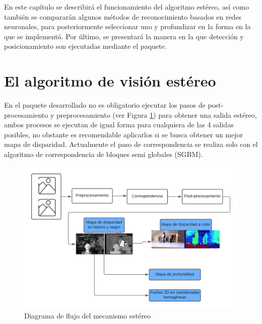 En este capítulo se describirá el funcionamiento del algoritmo estéreo, así como también se compararán algunos métodos de reconocimiento basados en redes neuronales, para posteriormente seleccionar uno y profundizar en la forma en la que se implementó. Por último, se presentará la manera en la que detección y posicionamiento son ejecutadas mediante el paquete. 
\section{El algoritmo de visión estéreo}
En el paquete desarrollado no es obligatorio ejecutar los pasos de post-procesamiento y preprocesamiento (ver Figura \ref{stereo_pipeline}) para obtener una salida estéreo, ambos procesos se ejecutan de igual forma para cualquiera de las 4 salidas posibles, no obstante es recomendable aplicarlos si se busca obtener un mejor mapa de disparidad. Actualmente el paso de correspondencia se realiza solo con el algoritmo de correspondencia de bloques semi globales (SGBM).
\begin{figure}[H]
    \centering
    \includegraphics[scale=0.4]{Recursos/stereo_pipeline.png}
    \caption{Diagrama de flujo del mecanismo estéreo}
    \label{stereo_pipeline}
\end{figure}
